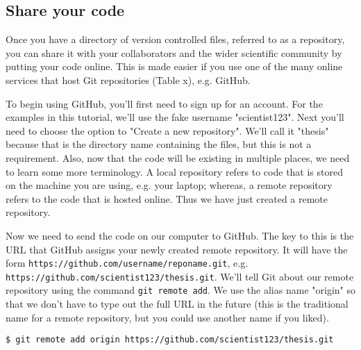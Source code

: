 \subsection{Share your code}

Once you have a directory of version controlled files, referred to as a repository, you can share it with your collaborators and the wider scientific community by putting your code online.
This is made easier if you use one of the many online services that host Git repositories (Table x), e.g. GitHub.

To begin using GitHub, you'll first need to sign up for an account.
For the examples in this tutorial, we'll use the fake username "scientist123".
Next you'll need to choose the option to "Create a new repository".
We'll call it "thesis" because that is the directory name containing the files, but this is not a requirement.
Also, now that the code will be existing in multiple places, we need to learn some more terminology.
A local repository refers to code that is stored on the machine you are using, e.g. your laptop; whereas, a remote repository refers to the code that is hosted online.
Thus we have just created a remote repository.

Now we need to send the code on our computer to GitHub.
The key to this is the URL that GitHub assigns your newly created remote repository.
It will have the form \verb|https://github.com/username/reponame.git|, e.g. \verb|https://github.com/scientist123/thesis.git|.
We'll tell Git about our remote repository using the command \verb|git remote add|.
We use the alias name "origin" so that we don't have to type out the full URL in the future (this is the traditional name for a remote repository, but you could use another name if you liked).

\begin{lstlisting}
$ git remote add origin https://github.com/scientist123/thesis.git
\end{lstlisting}

